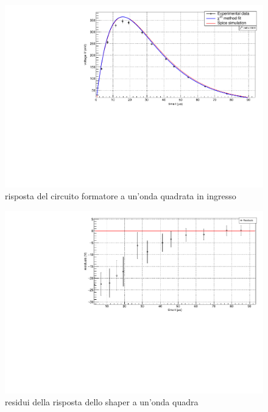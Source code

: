 \documentclass{article}
\begin{document}
\begin{center}
    \begin{figure}[H]
    \centering
    \includegraphics[scale=0.375, angle=0]{forma_no_pz.pdf}
    \caption{risposta del circuito formatore a un'onda quadrata in ingresso}
    \label{fig:forma_no_pz}
    \end{figure}
\end{center}

\begin{center}
    \begin{figure}[H]
    \centering
    \includegraphics[scale=0.375, angle=0]{residui_forma_onda_no_pz.pdf}
    \caption{residui della risposta dello shaper a un'onda quadra}
    \label{fig:forma_no_pz}
    \end{figure}
\end{center}
\end{document}
